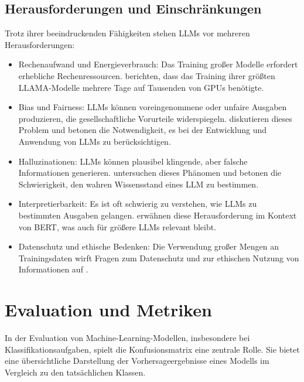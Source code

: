 \subsection{Herausforderungen und Einschränkungen}
\label{subsec:llm-challenges}

Trotz ihrer beeindruckenden Fähigkeiten stehen \glspl{LLM} vor mehreren Herausforderungen:

\begin{itemize}
	\item Rechenaufwand und Energieverbrauch: Das Training großer Modelle erfordert erhebliche Rechenressourcen. \textcite{TouvronHugo2023LOaE} berichten, dass das Training ihrer größten LLAMA-Modelle mehrere Tage auf Tausenden von GPUs benötigte.
	
	\item Bias und Fairness: \glspl{LLM} können voreingenommene oder unfaire Ausgaben produzieren, die gesellschaftliche Vorurteile widerspiegeln. \textcite{BrownTomB2020LMaF} diskutieren dieses Problem und betonen die Notwendigkeit, es bei der Entwicklung und Anwendung von \glspl{LLM} zu berücksichtigen.
	
	\item Halluzinationen: \glspl{LLM} können plausibel klingende, aber falsche Informationen generieren. \textcite{JiangZhengbao2020HCWK} untersuchen dieses Phänomen und betonen die Schwierigkeit, den wahren Wissensstand eines \gls{LLM} zu bestimmen.
	
	\item Interpretierbarkeit: Es ist oft schwierig zu verstehen, wie \glspl{LLM} zu bestimmten Ausgaben gelangen. \textcite{DevlinJacob2019BPoD} erwähnen diese Herausforderung im Kontext von BERT, was auch für größere \glspl{LLM} relevant bleibt.
	
	\item Datenschutz und ethische Bedenken: Die Verwendung großer Mengen an Trainingsdaten wirft Fragen zum Datenschutz und zur ethischen Nutzung von Informationen auf \cite{TouvronHugo2023LOaE}.
\end{itemize}

\section{Evaluation und Metriken}
\label{sec:evaluation-metrics}
	
In der Evaluation von Machine-Learning-Modellen, insbesondere bei Klassifikationsaufgaben, spielt die Konfusionsmatrix eine zentrale Rolle. Sie bietet eine übersichtliche Darstellung der Vorhersageergebnisse eines Modells im Vergleich zu den tatsächlichen Klassen.

